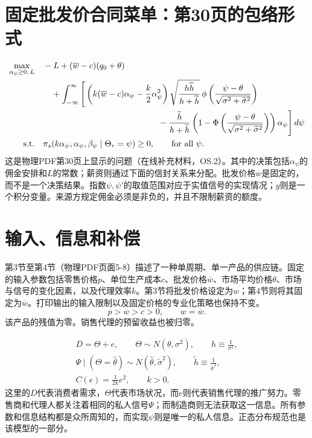 \documentclass{article}
\begin{document}
\section*{固定批发价合同菜单：第30页的包络形式}

\begin{equation*}
\begin{aligned}
\max_{\alpha_\psi\geq 0,\,L}\quad
&-L+(\overline w-c)(q_0+\theta)\\
&\quad+\int_{-\infty}^{\infty}\Bigg[
\left(k(\overline w-c)\alpha_\psi-\frac{k}{2}\alpha_\psi^2\right)
\sqrt{\frac{h\widetilde h}{h+\widetilde h}}\,
\phi\left(\frac{\psi-\theta}{\sqrt{\sigma^2+\widetilde\sigma^2}}\right)\\
&\hspace{48mm}-\frac{\widetilde h}{h+\widetilde h}
\left(1-\Phi\left(\frac{\psi-\theta}{\sqrt{\sigma^2+\widetilde\sigma^2}}\right)\right)\alpha_\psi
\Bigg]\,d\psi\\
\text{s.t.}\quad
&\pi_s(k\alpha_\psi,\alpha_\psi,\beta_\psi\mid\Theta_r=\psi)\geq 0,
\qquad\text{for all }\psi.
\end{aligned}
\end{equation*}
这是物理PDF第30页上显示的问题（在线补充材料，OS.2）。其中的决策包括\(\alpha_\psi\)的佣金安排和\(L\)的常数；薪资则通过下面的信封关系来分配。批发价格\(\overline w\)是固定的，而不是一个决策结果。指数\(\psi,\psi'\)的取值范围对应于实值信号的实现情况；\(y\)则是一个积分变量。来源方规定佣金必须是非负的，并且不限制薪资的额度。

\section*{输入、信息和补偿}

第3节至第4节（物理PDF页面5-8）描述了一种单周期、单一产品的供应链。固定的输入参数包括零售价格\(p\)、单位生产成本\(c\)、批发价格\(\overline w\)、市场平均价格\(\theta\)、市场与信号的变化因素，以及代理效率\(k\)。第3节将批发价格设定为\(w\)；第4节则将其固定为\(\overline w\)。打印输出的输入限制以及固定价格的专业化策略也保持不变。
\[
p>w>c>0,\qquad w=\overline w.
\]
该产品的残值为零。销售代理的预留收益也被归零。

\begin{gather*}
D=\Theta+e,\qquad
\Theta\sim N(\theta,\sigma^2),\qquad h\equiv\frac{1}{\sigma^2},\\
\Psi\mid(\Theta=\widehat\theta)\sim N(\widehat\theta,\widetilde\sigma^2),
\qquad \widetilde h\equiv\frac{1}{\widetilde\sigma^2},\\
C(e)=\frac{1}{2k}e^2,\qquad k>0.
\end{gather*}
这里的\(D\)代表消费者需求，\(\Theta\)代表市场状况，而\(e\)则代表销售代理的推广努力。零售商和代理人都关注着相同的私人信号\(\Psi\)；而制造商则无法获取这一信息。所有参数和信息结构都是众所周知的，而实现\(\psi\)则是唯一的私人信息。正态分布规范也是该模型的一部分。
\end{document}
